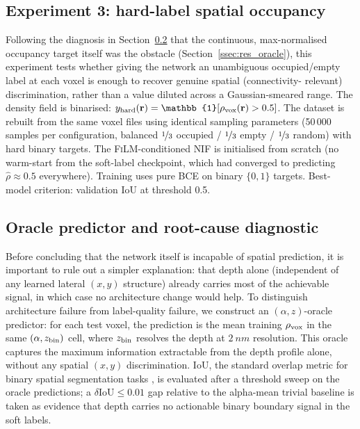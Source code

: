 \documentclass[aip,amsmath,amssymb,reprint]{revtex4-1}
\renewcommand{\ang}{\ensuremath{\alpha}} %
\newcommand{\iou}{\ensuremath{\mathrm{IoU}}}
\newcommand{\nif}{\textsc{NIF}}
\newcommand{\film}{\textsc{FiLM}}
\begin{document}
\subsection{Experiment 3: hard-label spatial occupancy}
\label{ssec:exp3}

Following the diagnosis in Section~\ref{ssec:oracle} that the
continuous, max-normalised occupancy target itself was the
obstacle (Section~\ref{ssec:res_oracle}), this experiment tests
whether giving the network an unambiguous occupied/empty label at
each voxel is enough to recover genuine spatial (connectivity-
relevant) discrimination, rather than a value diluted across a
Gaussian-smeared range.
The density field is binarised:
$y_{\rm hard}(\mathbf{r}) = \mathbb{1}[\rho_{\rm vox}(\mathbf{r}) > 0.5]$.
The dataset is rebuilt from the same voxel files using identical
sampling parameters (50\,000 samples per configuration, balanced
$\nicefrac{1}{3}$ occupied / $\nicefrac{1}{3}$ empty /
$\nicefrac{1}{3}$ random) with hard binary targets.
The \film{}-conditioned \nif{} is initialised from scratch (no
warm-start from the soft-label checkpoint, which had converged to
predicting $\hat{\rho} \approx 0.5$ everywhere).
Training uses pure BCE on binary $\{0,1\}$ targets.
Best-model criterion: validation IoU at threshold 0.5.

\subsection{Oracle predictor and root-cause diagnostic}
\label{ssec:oracle}

Before concluding that the network itself is incapable of spatial
prediction, it is important to rule out a simpler explanation: that
depth alone (independent of any learned lateral $(x,y)$ structure)
already carries most of the achievable signal, in which case no
architecture change would help.
To distinguish architecture failure from label-quality failure, we
construct an $(\alpha, z)$-oracle predictor: for each test voxel,
the prediction is the mean training $\rho_{\rm vox}$ in the same
$(\ang, z_{\rm bin})$ cell, where $z_{\rm bin}$ resolves the
depth at $\SI{2}{nm}$ resolution.
This oracle captures the maximum information extractable from the
depth profile alone, without any spatial $(x,y)$ discrimination.
IoU, the standard overlap metric for binary spatial segmentation tasks
\citep{rezatofighi2019giou}, is evaluated after a threshold sweep on the
oracle predictions;
a $\delta\iou \leq 0.01$ gap relative to the alpha-mean trivial
baseline is taken as evidence that depth carries no actionable
binary boundary signal in the soft labels.
\end{document}
